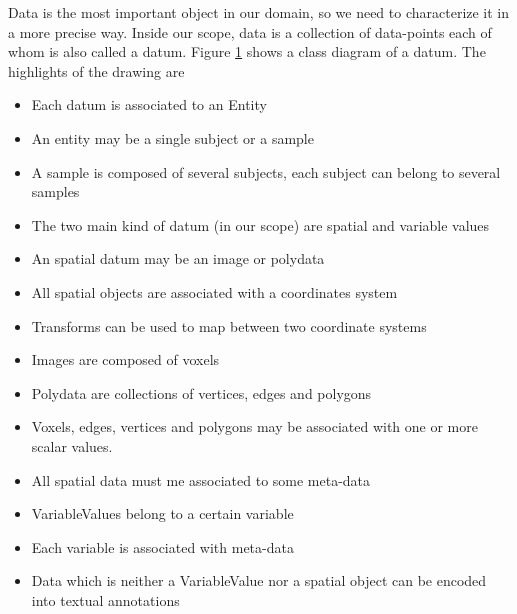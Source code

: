 \begin{figure}

\caption{\label{fig_datum_class}}
\end{figure}

Data is the most important object in our domain, so we need to characterize it in a more precise way. Inside our scope, data is a collection of data-points each of whom is also called a datum. Figure \ref{fig_datum_class} shows a class diagram of a datum. The highlights of the drawing are


\begin{itemize}
\item Each datum is associated to an Entity
\item An entity may be a single subject or a sample
\item A sample is composed of several subjects, each subject can belong to several samples
\item The two main kind of datum (in our scope) are spatial and variable values
\item An spatial datum may be an image or polydata
\item All spatial objects are associated with a coordinates system
\item Transforms can be used to map between two coordinate systems
\item Images are composed of voxels
\item Polydata are collections of vertices, edges and polygons
\item Voxels, edges, vertices and polygons may be associated with one or more scalar values.
\item All spatial data must me associated to some meta-data
\item VariableValues belong to a certain variable
\item Each variable is associated with meta-data  
\item Data which is neither a VariableValue nor a spatial object can be encoded into textual annotations
\end{itemize} 

